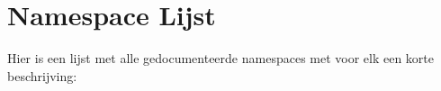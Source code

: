 \section{Namespace Lijst}
Hier is een lijst met alle gedocumenteerde namespaces met voor elk een korte beschrijving\+:\begin{DoxyCompactList}
\item{}
\end{DoxyCompactList}
